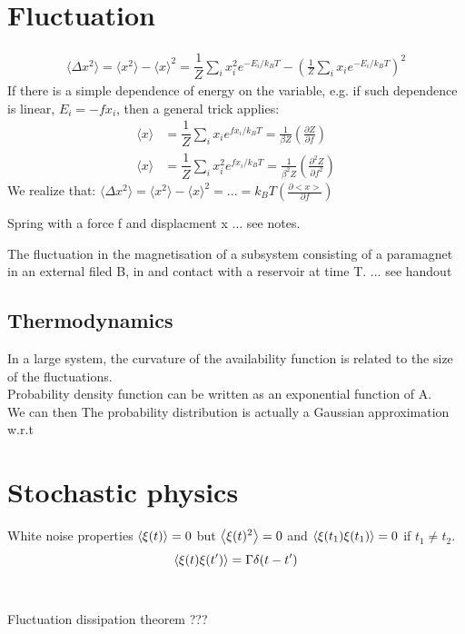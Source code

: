 \documentclass[12pt,a4paper]{article}
\begin{document}
\section{Fluctuation}
\begin{align*}
    \langle \Delta x^2\rangle = \langle x^2\rangle -\langle x\rangle ^2 
    =\dfrac{1}{Z}\sum_i x_i^2 e^{-E_i/k_BT} - (\frac{1}{Z}\sum_i x_i e^{-E_i/k_BT})^2
\end{align*}
If there is a simple dependence of energy on the variable, 
e.g. if such dependence is linear, $E_i=-fx_i$, then a general trick applies:
\begin{align*}
    \langle x\rangle &= \dfrac{1}{Z}\sum_i x_i e^{fx_i/k_BT} = \frac{1}{\beta Z}(\frac{\partial Z}{\partial f})\\
    \langle x\rangle &= \dfrac{1}{Z}\sum_i x_i^2 e^{fx_i/k_BT} = \frac{1}{\beta^2 Z}(\frac{\partial^2 Z}{\partial f^2})
\end{align*}
We realize that:
$\langle \Delta x^2\rangle = \langle x^2\rangle -\langle x\rangle ^2 = ... = k_BT(\frac{\partial <x>}{\partial f})$\\
\begin{example}
    {Spring with a force f and displacment x}
    {... see notes.}
\end{example}
\begin{example}
    {The fluctuation in the magnetisation of a subsystem consisting of a paramagnet in an external filed B, in and contact with a reservoir at time T.}
    {... see handout}
\end{example}
\subsection{Thermodynamics}
In a large system, the curvature of the availability function is related to the size of the fluctuations.\\
Probability density function can be written as an exponential function of A.\\
We can then 
The probability distribution is actually a Gaussian approximation w.r.t
\section{Stochastic physics}
    \begin{theorem}
        {White noise properties}{
        $\expval{\xi(t)}=0$ but $\expval{\xi(t)^2}=0$ and  $\expval{\xi(t_1)\xi(t_1)}=0$ if $t_1\neq t_2$.
        \begin{equation*}
            \expval{\xi(t)\xi(t')}=\Gamma\delta(t-t')
        \end{equation*}
        }
    \end{theorem}
    \\
    \begin{theorem}
        {Fluctuation dissipation theorem}{
        ???
        }
    \end{theorem}
\end{document}
